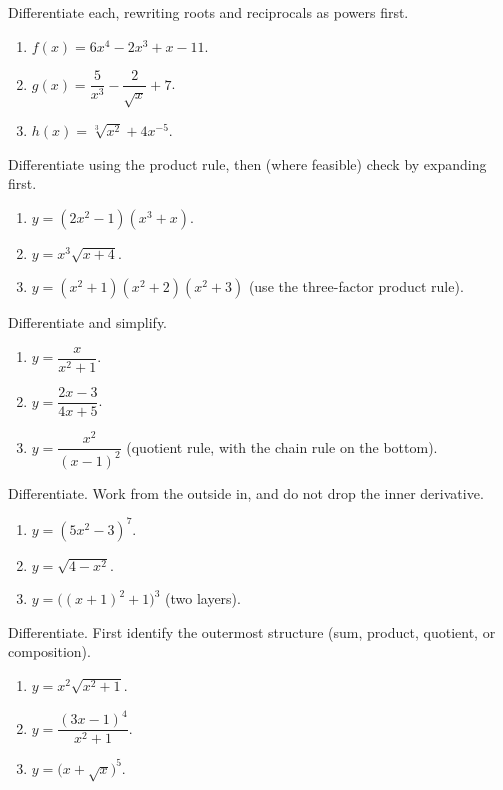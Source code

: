 \begin{exercise}
Differentiate each, rewriting roots and reciprocals as powers first.
\begin{enumerate}
  \item $f(x) = 6x^4 - 2x^3 + x - 11$.
  \item $g(x) = \dfrac{5}{x^3} - \dfrac{2}{\sqrt{x}} + 7$.
  \item $h(x) = \sqrt[3]{x^2} + 4x^{-5}$.
\end{enumerate}
\end{exercise}

\begin{exercise}
Differentiate using the product rule, then (where feasible) check by expanding first.
\begin{enumerate}
  \item $y = (2x^2 - 1)(x^3 + x)$.
  \item $y = x^3\sqrt{x+4}$.
  \item $y = (x^2+1)(x^2+2)(x^2+3)$ \;(use the three-factor product rule).
\end{enumerate}
\end{exercise}

\begin{exercise}
Differentiate and simplify.
\begin{enumerate}
  \item $y = \dfrac{x}{x^2+1}$.
  \item $y = \dfrac{2x-3}{4x+5}$.
  \item $y = \dfrac{x^2}{(x-1)^2}$ \;(quotient rule, with the chain rule on the bottom).
\end{enumerate}
\end{exercise}

\begin{exercise}
Differentiate. Work from the outside in, and do not drop the inner derivative.
\begin{enumerate}
  \item $y = (5x^2 - 3)^{7}$.
  \item $y = \sqrt{4 - x^2}$.
  \item $y = \big((x+1)^2 + 1\big)^{3}$ \;(two layers).
\end{enumerate}
\end{exercise}

\begin{exercise}
Differentiate. First identify the outermost structure (sum, product, quotient, or
composition).
\begin{enumerate}
  \item $y = x^2\sqrt{x^2+1}$.
  \item $y = \dfrac{(3x-1)^4}{x^2+1}$.
  \item $y = \big(x + \sqrt{x}\big)^5$.
\end{enumerate}
\end{exercise}

